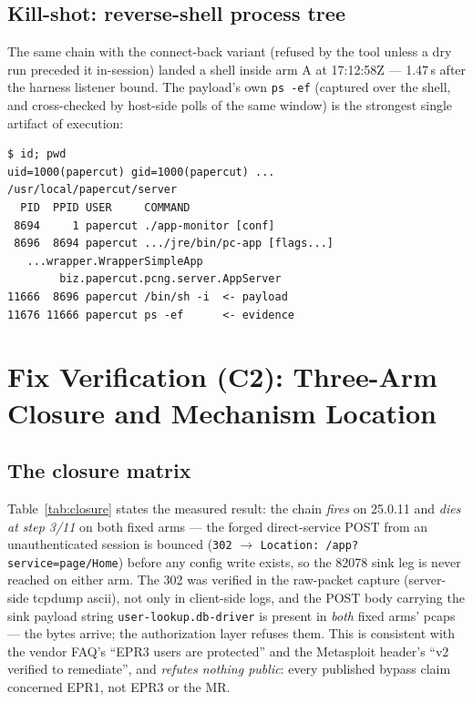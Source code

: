 \documentclass[journal]{IEEEtran}
\begin{document}
\subsection{Kill-shot: reverse-shell process tree}
The same chain with the connect-back variant (refused by the tool unless a dry
run preceded it in-session) landed a shell inside arm A at 17:12:58Z — 1.47\,s
after the harness listener bound. The payload's own \texttt{ps -ef} (captured
over the shell, and cross-checked by host-side polls of the same window) is the
strongest single artifact of execution:
\begin{lstlisting}[style=shell, caption={Measured process tree (abridged;
\texttt{evidence/processes/run-04c-*-tree.txt} +
\texttt{run-04c-*/reverse-shell-session.txt}, transcript 13017 B). The
application JVM (\texttt{comm} \texttt{pc-app}, Tanuki wrapper +
\texttt{AppServer} in its command line) spawns the interactive shell; the
shell's grandchild is our evidence command. \texttt{uid=1000(papercut)}, CWD
\texttt{server}. A fresh phase-06 re-fire reproduced the identical lineage with
drifted PIDs (2096/1127) — shape constant, PIDs are not.}, label={lst:tree},
language={}, numbers=none]
$ id; pwd
uid=1000(papercut) gid=1000(papercut) ...
/usr/local/papercut/server
  PID  PPID USER     COMMAND
 8694     1 papercut ./app-monitor [conf]
 8696  8694 papercut .../jre/bin/pc-app [flags...]
   ...wrapper.WrapperSimpleApp
        biz.papercut.pcng.server.AppServer
11666  8696 papercut /bin/sh -i  <- payload
11676 11666 papercut ps -ef      <- evidence
\end{lstlisting}

\section{Fix Verification (C2): Three-Arm Closure and Mechanism Location}
\label{sec:fix}

\subsection{The closure matrix}
Table~\ref{tab:closure} states the measured result: the chain \emph{fires} on
25.0.11 and \emph{dies at step 3/11} on both fixed arms — the forged
direct-service POST from an unauthenticated session is bounced
(\texttt{302} $\rightarrow$ \texttt{Location: /app?service=page/Home}) before
any config write exists, so the 82078 sink leg is never reached on either arm.
The 302 was verified in the raw-packet capture (server-side tcpdump ascii), not
only in client-side logs, and the POST body carrying the sink payload string
\texttt{user-lookup.db-driver} is present in \emph{both} fixed arms' pcaps —
the bytes arrive; the authorization layer refuses them. This is consistent with
the vendor FAQ's ``EPR3 users are protected'' and the Metasploit header's ``v2
verified to remediate'', and \emph{refutes nothing public}: every published
bypass claim concerned EPR1, not EPR3 or the MR.
\end{document}
